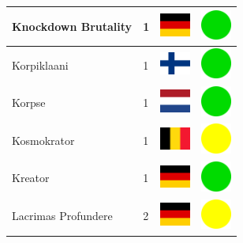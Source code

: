 \documentclass[12pt, a4paper, twoside]{report}
\begin{document}
\begin{center}
\begin{longtable}{|p{5cm}|p{2cm}|p{2cm}|p{2cm}|}
			Knockdown Brutality & 1 & \includegraphics[width=1cm]{4x3/de} & \includegraphics[width=1cm]{likes/y} \\ \hline
			Korpiklaani & 1 & \includegraphics[width=1cm]{4x3/fi} & \includegraphics[width=1cm]{likes/y} \\ \hline
			Korpse & 1 & \includegraphics[width=1cm]{4x3/nl} & \includegraphics[width=1cm]{likes/y} \\ \hline
			Kosmokrator & 1 & \includegraphics[width=1cm]{4x3/be} & \includegraphics[width=1cm]{likes/m} \\ \hline
			Kreator & 1 & \includegraphics[width=1cm]{4x3/de} & \includegraphics[width=1cm]{likes/y} \\ \hline
			Lacrimas Profundere & 2 & \includegraphics[width=1cm]{4x3/de} & \includegraphics[width=1cm]{likes/m} \\ \hline

\end{longtable}
\end{center}
\end{document}
